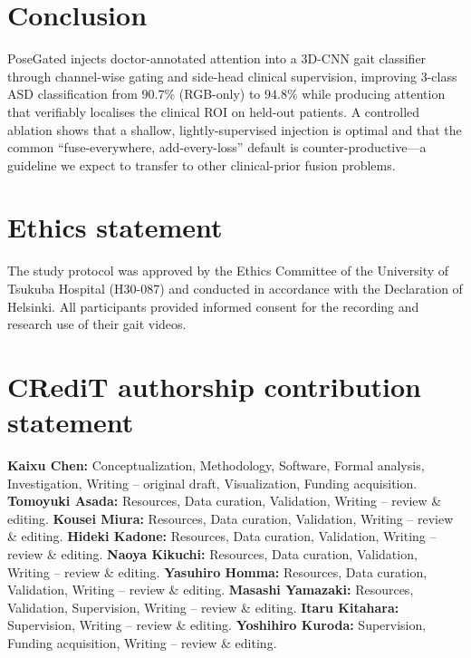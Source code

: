 \documentclass[review,authoryear,times]{elsarticle}
\begin{document}
\section{Conclusion}
\label{sec:conclusion}

PoseGated injects doctor-annotated attention into a 3D-CNN gait classifier through
channel-wise gating and side-head clinical supervision, improving 3-class ASD
classification from $90.7\%$ (RGB-only) to $94.8\%$ while producing attention that
verifiably localises the clinical ROI on held-out patients. A controlled ablation
shows that a shallow, lightly-supervised injection is optimal and that the common
``fuse-everywhere, add-every-loss'' default is counter-productive---a guideline we
expect to transfer to other clinical-prior fusion problems.


\section*{Ethics statement}
The study protocol was approved by the Ethics Committee of the University of
Tsukuba Hospital (H30-087) and conducted in accordance with the Declaration of
Helsinki. All participants provided informed consent for the recording and
research use of their gait videos.

\section*{CRediT authorship contribution statement}
\textbf{Kaixu Chen:} Conceptualization, Methodology, Software, Formal analysis,
Investigation, Writing -- original draft, Visualization, Funding acquisition.
\textbf{Tomoyuki Asada:} Resources, Data curation, Validation, Writing -- review \& editing.
\textbf{Kousei Miura:} Resources, Data curation, Validation, Writing -- review \& editing.
\textbf{Hideki Kadone:} Resources, Data curation, Validation, Writing -- review \& editing.
\textbf{Naoya Kikuchi:} Resources, Data curation, Validation, Writing -- review \& editing.
\textbf{Yasuhiro Homma:} Resources, Data curation, Validation, Writing -- review \& editing.
\textbf{Masashi Yamazaki:} Resources, Validation, Supervision, Writing -- review \& editing.
\textbf{Itaru Kitahara:} Supervision, Writing -- review \& editing.
\textbf{Yoshihiro Kuroda:} Supervision, Funding acquisition, Writing -- review \& editing.
\end{document}
